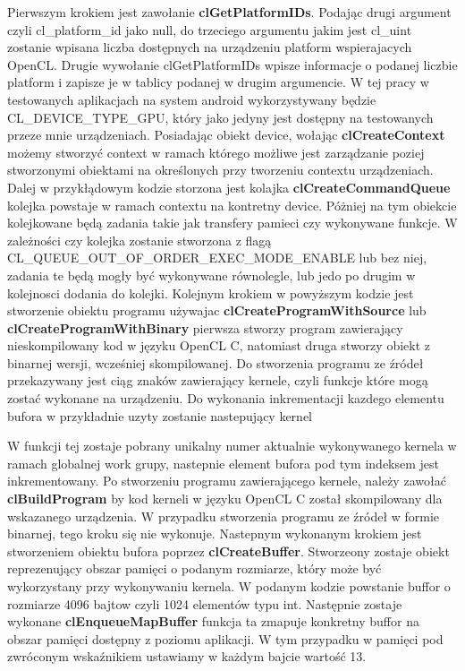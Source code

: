 Pierwszym krokiem jest zawołanie \textbf{clGetPlatformIDs}. Podając drugi argument czyli cl\_platform\_id\* jako null, do trzeciego argumentu jakim jest cl\_uint\* zostanie wpisana liczba dostępnych na urządzeniu platform wspierajacych OpenCL.
Drugie wywołanie clGetPlatformIDs wpisze informacje o podanej liczbie platform i zapisze je w tablicy podanej w drugim argumencie.
W tej pracy w testowanych aplikacjach na system android wykorzystywany będzie CL\_DEVICE\_TYPE\_GPU, który jako jedyny jest dostępny na testowanych przeze mnie urządzeniach.
Posiadając obiekt device, wołając \textbf{clCreateContext} możemy stworzyć context w ramach którego możliwe jest zarządzanie poziej stworzonymi obiektami na określonych przy tworzeniu contextu urządzeniach. 
Dalej w przykłądowym kodzie storzona jest kolajka \textbf{clCreateCommandQueue} kolejka powstaje w ramach contextu na kontretny device. Póżniej na tym obiekcie kolejkowane będą zadania takie jak transfery pamieci czy wykonywane funkcje. W zależności czy kolejka zostanie stworzona z flagą CL\_QUEUE\_OUT\_OF\_ORDER\_EXEC\_MODE\_ENABLE lub bez niej, zadania te będą mogły być wykonywane równolegle, lub jedo po drugim w kolejnosci dodania do kolejki.
Kolejnym krokiem w powyższym kodzie jest stworzenie obiektu programu używajac \textbf{clCreateProgramWithSource} lub \textbf{clCreateProgramWithBinary} pierwsza stworzy program zawierający nieskompilowany kod w języku OpenCL C, natomiast druga stworzy obiekt z binarnej wersji, wcześniej skompilowanej. Do stworzenia programu ze źródeł przekazywany jest ciąg znaków zawierający kernele, czyli funkcje które mogą zostać wykonane na urządzeniu.
Do wykonania inkrementacji kazdego elementu bufora w przykładnie uzyty zostanie nastepujący kernel

W funkcji tej zostaje pobrany unikalny numer aktualnie wykonywanego kernela w ramach globalnej work grupy, nastepnie element bufora pod tym indeksem jest inkrementowany. 
Po stworzeniu programu zawierającego kernele, należy zawołać \textbf{clBuildProgram} by kod kerneli w języku OpenCL C został skompilowany dla wskazanego urządzenia. W przypadku stworzenia programu ze źródeł w formie binarnej, tego kroku się nie wykonuje.
Nastepnym wykonanym krokiem jest stworzeniem obiektu bufora poprzez \textbf{clCreateBuffer}. Stworzeony zostaje obiekt reprezenujący obszar pamięci o podanym rozmiarze, który może być wykorzystany przy wykonywaniu kernela. W podanym kodzie powstanie buffor o rozmiarze 4096 bajtow czyli 1024 elementów typu int.
Następnie zostaje wykonane \textbf{clEnqueueMapBuffer} funkcja ta zmapuje konkretny buffor na obszar pamięci dostępny z poziomu aplikacji. W tym przypadku w pamięci pod zwróconym wskaźnikiem ustawiamy w każdym bajcie wartość 13.
